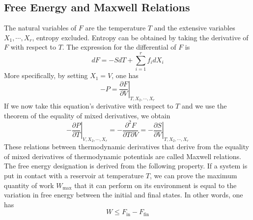 \subsection{Free Energy and Maxwell Relations}
The natural variables of $F$ are the temperature $T$ and the extensive variables $X_1,\cdots,X_r$, entropy excluded. Entropy can be obtained by taking the derivative of $F$ with respect to $T$. The expression for the differential of $F$ is
\[dF = -SdT + \sum_{i = 1}^{r} f_i dX_i\]
More specifically, by setting $X_1 = V$, one has
\[-P =\left. \frac{\partial F}{\partial V} \right|_{T,X_2,\cdots,X_r}\]
If we now take this equation's derivative with respect to $T$ and we use the theorem of the equality of mixed derivatives, we obtain
\[\left. -\frac{\partial P}{\partial T} \right|_{V,X_2,\cdots,X_r} = -\frac{\partial^2 F}{\partial T \partial V} = \left. -\frac{\partial S}{\partial V} \right|_{T,X_2,\cdots,X_r}\]
These relations between thermodynamic derivatives that derive from the equality of mixed derivatives of thermodynamic potentials are called Maxwell relations.
\\
The free energy designation is derived from the following property. If a system is put in contact with a reservoir at temperature $T$, we can prove the maximum quantity of work $W_{\mathrm{max}}$ that it can perform on its environment is equal to the variation in free energy between the initial and final states. In other words, one has
\[W \leq F_{\mathrm{in}} - F_{\mathrm{fin}}\]

